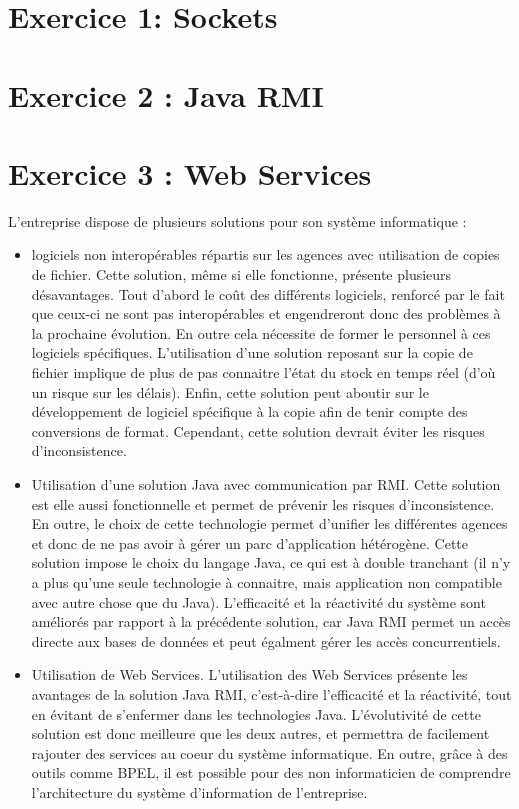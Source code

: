 \documentclass[a4paper]{article}
\begin{document}
\section{Exercice 1: Sockets}



\section{Exercice 2 : Java RMI}

\section{Exercice 3 : Web Services}

L'entreprise dispose de plusieurs solutions pour son système informatique :
\begin{itemize}
\item logiciels non interopérables répartis sur les agences avec utilisation de copies de fichier.
Cette solution, même si elle fonctionne, présente plusieurs désavantages. Tout d'abord le coût des différents logiciels, renforcé par le fait que ceux-ci ne sont pas interopérables et engendreront donc des problèmes à la prochaine évolution. En outre cela nécessite de former le personnel à ces logiciels spécifiques. L'utilisation d'une solution reposant sur la copie de fichier implique de plus de  pas connaitre l'état du stock en temps réel (d'où un risque sur les délais). Enfin, cette solution peut aboutir sur le développement de logiciel spécifique à la copie afin de tenir compte des conversions de format. Cependant, cette solution devrait éviter les risques d'inconsistence.
\item Utilisation d'une solution Java avec communication par RMI. Cette solution est elle aussi fonctionnelle et permet de prévenir les risques d'inconsistence. En outre, le choix de cette technologie permet d'unifier les différentes agences et donc de ne pas avoir à gérer un parc d'application hétérogène. Cette solution impose le choix du langage Java, ce qui est à double tranchant (il n'y a plus qu'une seule technologie à connaitre, mais application non compatible avec autre chose que du Java). L'efficacité et la réactivité du système sont améliorés par rapport à la précédente solution, car Java RMI permet un accès directe aux bases de données et peut égalment gérer les accès concurrentiels.
\item Utilisation de Web Services. L'utilisation des Web Services présente les avantages de la solution Java RMI, c'est-à-dire l'efficacité et la réactivité, tout en évitant de s'enfermer dans les  technologies Java. L'évolutivité de cette solution est donc meilleure que les deux autres, et permettra de facilement rajouter des services au coeur du système informatique. En outre, grâce à des outils comme BPEL, il est possible pour des non informaticien de comprendre l'architecture du système d'information de l'entreprise.
\end{itemize}
\end{document}
